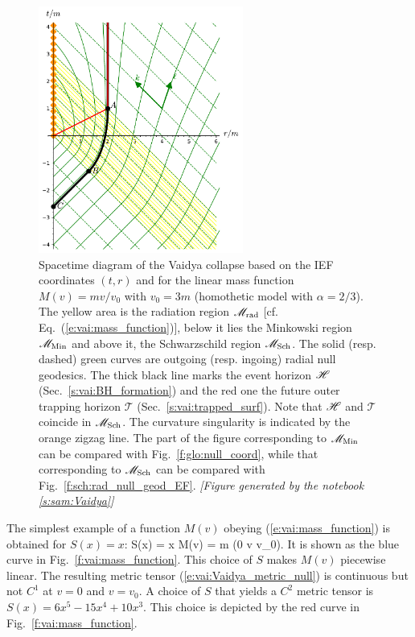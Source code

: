 \begin{figure}
\centerline{\includegraphics[width=0.6\textwidth]{vai_diag_S0.pdf}}
\caption[]{\label{f:vai:diag_S0} \footnotesize
Spacetime diagram of the Vaidya collapse based on the IEF coordinates $(t, r)$
and for the linear mass function $M(v)=m v/v_0$ with $v_0 = 3 m$
(homothetic model with $\alpha = 2/3$).
The yellow area is the radiation region $\mathscr{M}_{\rm rad}$
[cf. Eq.~(\ref{e:vai:mass_function})],
below it lies the Minkowski region $\mathscr{M}_{\rm Min}$
and above it, the Schwarzschild region $\mathscr{M}_{\rm Sch}$.
The solid (resp. dashed) green curves are outgoing (resp. ingoing) radial
null geodesics. The thick black line marks the event horizon $\mathscr{H}$ (Sec.~\ref{s:vai:BH_formation}) and
the red one the future outer trapping horizon $\mathscr{T}$ (Sec.~\ref{s:vai:trapped_surf}).
Note that $\mathscr{H}$ and $\mathscr{T}$ coincide in $\mathscr{M}_{\rm Sch}$.
The curvature singularity
is indicated by the orange zigzag line. The part of the figure corresponding
to $\mathscr{M}_{\rm Min}$ can be compared with Fig.~\ref{f:glo:null_coord},
while that corresponding to $\mathscr{M}_{\rm Sch}$ can be
compared with Fig.~\ref{f:sch:rad_null_geod_EF}.
\textsl{[Figure generated by the notebook \ref{s:sam:Vaidya}]}
}
\end{figure}


The simplest example of a function $M(v)$
obeying (\ref{e:vai:mass_function}) is obtained for $S(x) = x$:
\be \label{e:vai:S_linear}
     S(x) = x \quad \iff \quad M(v) = m  \quad (0 \leq v \leq v_0).
\ee
It is shown as the blue curve in Fig.~\ref{f:vai:mass_function}.
This choice of $S$ makes $M(v)$ piecewise linear. The resulting metric tensor
(\ref{e:vai:Vaidya_metric_null}) is continuous but not $C^1$ at $v=0$ and $v=v_0$. A choice
of $S$ that yields a $C^2$ metric tensor is $S(x) = 6 x^5 - 15 x^4 + 10 x^3$.
This choice is depicted by the red curve in Fig.~\ref{f:vai:mass_function}.

